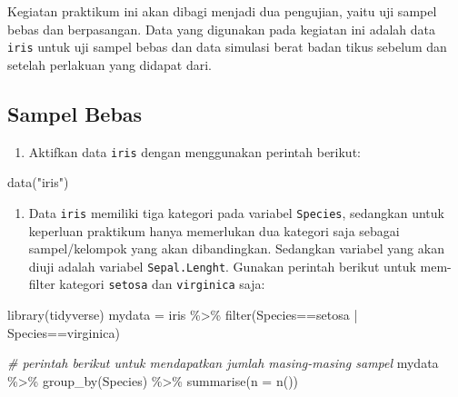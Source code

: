 \documentclass[
]{book}
\newenvironment{Shaded}{\begin{snugshade}}{\end{snugshade}}
\newcommand{\AttributeTok}[1]{\textcolor[rgb]{0.77,0.63,0.00}{#1}}
\newcommand{\CommentTok}[1]{\textcolor[rgb]{0.56,0.35,0.01}{\textit{#1}}}
\newcommand{\FunctionTok}[1]{\textcolor[rgb]{0.00,0.00,0.00}{#1}}
\newcommand{\NormalTok}[1]{#1}
\newcommand{\OtherTok}[1]{\textcolor[rgb]{0.56,0.35,0.01}{#1}}
\newcommand{\SpecialCharTok}[1]{\textcolor[rgb]{0.00,0.00,0.00}{#1}}
\newcommand{\StringTok}[1]{\textcolor[rgb]{0.31,0.60,0.02}{#1}}
\providecommand{\tightlist}{%
  \setlength{\itemsep}{0pt}\setlength{\parskip}{0pt}}
\begin{document}
Kegiatan praktikum ini akan dibagi menjadi dua pengujian, yaitu uji sampel bebas dan berpasangan. Data yang digunakan pada kegiatan ini adalah data \texttt{iris} untuk uji sampel bebas dan data simulasi berat badan tikus sebelum dan setelah perlakuan yang didapat dari.

\hypertarget{sampel-bebas-1}{%
\subsection{Sampel Bebas}\label{sampel-bebas-1}}

\begin{enumerate}
\def\labelenumi{\arabic{enumi}.}
\tightlist
\item
  Aktifkan data \texttt{iris} dengan menggunakan perintah berikut:
\end{enumerate}

\begin{Shaded}
\begin{Highlighting}[]
\FunctionTok{data}\NormalTok{(}\StringTok{"iris"}\NormalTok{)}
\end{Highlighting}
\end{Shaded}

\begin{enumerate}
\def\labelenumi{\arabic{enumi}.}
\setcounter{enumi}{1}
\tightlist
\item
  Data \texttt{iris} memiliki tiga kategori pada variabel \texttt{Species}, sedangkan untuk keperluan praktikum hanya memerlukan dua kategori saja sebagai sampel/kelompok yang akan dibandingkan. Sedangkan variabel yang akan diuji adalah variabel \texttt{Sepal.Lenght}. Gunakan perintah berikut untuk mem-filter kategori \texttt{setosa} dan \texttt{virginica} saja:
\end{enumerate}

\begin{Shaded}
\begin{Highlighting}[]
\FunctionTok{library}\NormalTok{(tidyverse)}
\NormalTok{mydata }\OtherTok{=}\NormalTok{ iris }\SpecialCharTok{\%\textgreater{}\%} \FunctionTok{filter}\NormalTok{(Species}\SpecialCharTok{==}\StringTok{\textquotesingle{}setosa\textquotesingle{}} \SpecialCharTok{|}\NormalTok{ Species}\SpecialCharTok{==}\StringTok{\textquotesingle{}virginica\textquotesingle{}}\NormalTok{)}

\CommentTok{\# perintah berikut untuk mendapatkan jumlah masing{-}masing sampel}
\NormalTok{mydata }\SpecialCharTok{\%\textgreater{}\%} \FunctionTok{group\_by}\NormalTok{(Species) }\SpecialCharTok{\%\textgreater{}\%} \FunctionTok{summarise}\NormalTok{(}\AttributeTok{n =} \FunctionTok{n}\NormalTok{())}
\end{Highlighting}
\end{Shaded}
\end{document}
